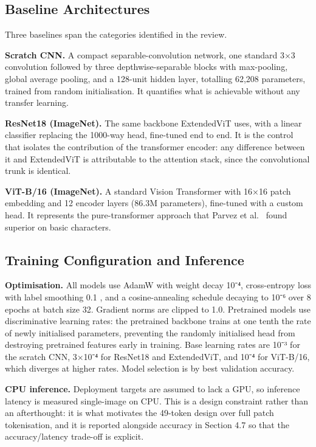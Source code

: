 \hypertarget{baseline-architectures}{%
\subsection{Baseline Architectures}\label{baseline-architectures}}

Three baselines span the categories identified in the review.

\textbf{Scratch CNN.} A compact separable-convolution network, one
standard 3×3 convolution followed by three depthwise-separable blocks
with max-pooling, global average pooling, and a 128-unit hidden layer,
totalling 62,208 parameters, trained from random initialisation. It
quantifies what is achievable without any transfer learning.

\textbf{ResNet18 (ImageNet).} The same backbone ExtendedViT uses, with a
linear classifier replacing the 1000-way head, fine-tuned end to end. It
is the control that isolates the contribution of the transformer
encoder: any difference between it and ExtendedViT is attributable to
the attention stack, since the convolutional trunk is identical.

\textbf{ViT-B/16 (ImageNet).} A standard Vision Transformer with 16×16
patch embedding and 12 encoder layers (86.3M parameters), fine-tuned
with a custom head. It represents the pure-transformer approach that
Parvez et al.~\citeyearpar{ref17} found superior on basic characters.

\hypertarget{training-configuration-and-inference}{%
\subsection{Training Configuration and
Inference}\label{training-configuration-and-inference}}

\textbf{Optimisation.} All models use AdamW \citep{ref53} with weight
decay 10⁻⁴, cross-entropy loss with label smoothing 0.1
\citep{ref55,ref56}, and a cosine-annealing schedule \citep{ref54}
decaying to 10⁻⁶ over 8 epochs at batch size 32. Gradient norms
are clipped to 1.0. Pretrained models use discriminative learning rates:
the pretrained backbone trains at one tenth the rate of newly
initialised parameters, preventing the randomly initialised head from
destroying pretrained features early in training. Base learning rates
are 10⁻³ for the scratch CNN, 3×10⁻⁴ for ResNet18 and ExtendedViT, and
10⁻⁴ for ViT-B/16, which diverges at higher rates. Model selection is by
best validation accuracy.

\textbf{CPU inference.} Deployment targets are assumed to lack a GPU, so
inference latency is measured single-image on CPU. This is a design
constraint rather than an afterthought: it is what motivates the
49-token design over full patch tokenisation, and it is reported
alongside accuracy in Section 4.7 so that the accuracy/latency trade-off
is explicit.


